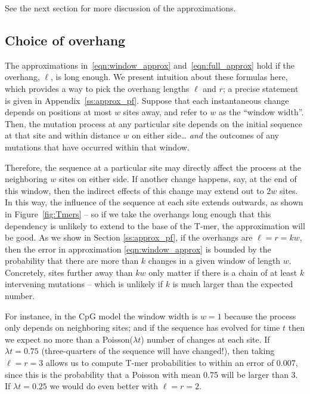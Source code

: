 \documentclass{article}
\theoremstyle{plain}
\theoremstyle{definition}
\begin{document}

See the next section for more discussion of the approximations.

\subsection{Choice of overhang}

The approximations in~\eqref{eqn:window_approx} and~\eqref{eqn:full_approx} hold
if the overhang, $\ell$, is long enough.
We present intuition about these formulas here, which provides a way to pick the overhang lengths $\ell$ and $r$;
a precise statement is given in Appendix~\ref{ss:approx_pf}.
Suppose that each instantaneous change depends on positions at most $w$ sites away,
and refer to $w$ as the ``window width''.
Then, the mutation process at any particular site
depends on the initial sequence at that site and within distance $w$ on either side\ldots
\emph{and} the outcomes of any mutations that have occurred within that window.

Therefore, the sequence at a particular site may directly affect the process at the neighboring $w$ sites on either side.
If another change happens, say, at the end of this window,
then the indirect effects of this change may extend out to $2w$ sites.
In this way, the influence of the sequence at each site extends outwards, as shown in Figure~\ref{fig:Tmers} --
so if we take the overhangs long enough that this dependency is unlikely to extend to the base of the T-mer,
the approximation will be good.
As we show in Section \ref{ss:approx_pf}, if the overhangs are $\ell = r = kw$,
then the error in approximation \eqref{eqn:window_approx}
is bounded by the probability that there are more than $k$ changes in a given window of length $w$.
Concretely, sites further away than $kw$ only matter if there is a chain of at least $k$ intervening mutations
-- which is unlikely if $k$ is much larger than the expected number.

For instance, in the CpG model the window width is $w=1$
because the process only depends on neighboring sites;
and if the sequence has evolved for time $t$ then we expect no more than a Poisson($\lambda t$) number of changes at each site.
If $\lambda t = 0.75$ (three-quarters of the sequence will have changed!),
then taking $\ell = r = 3$ allows us to compute T-mer probabilities to within an error of 0.007,
since this is the probability that a Poisson with mean 0.75 will be larger than 3.
If $\lambda t = 0.25$ we would do even better with $\ell = r = 2$.
\end{document}
